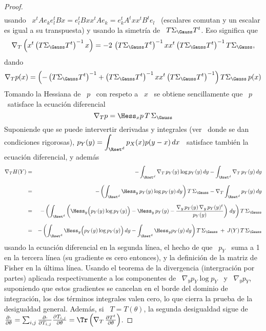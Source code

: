 \begin{proof}
\begin{eqnarray*}
  \end{eqnarray*}
  usando \ $x^t A e_k e_l^t B x = e_l^t B x x^t A e_k = e_k^t A^t x x^t B^t e_l$
  \  (escalares comutan y  un escalar  es igual  a su  transpuesta) y  usando la
  simetr\'ia de \ $T \Sigma_\Gauss T^t$.  Eso significa que
  \[
  \nabla_T \left( x^t \left( T \Sigma_\Gauss T^t \right)^{-1} x \right) = - 2 \,
  \left(  T \Sigma_\Gauss  T^t \right)^{-1}  x  x^t \left(  T \Sigma_\Gauss  T^t
  \right)^{-1} T \Sigma_\Gauss,
  \]
  dando
  \[
  \nabla_T p(x)  = \left( - \left(  T \Sigma_\Gauss T^t \right)^{-1}  + \left( T
      \Sigma_\Gauss  T^t   \right)^{-1}  x   x^t  \left(  T   \Sigma_\Gauss  T^t
    \right)^{-1} \right) T \Sigma_\Gauss \, p(x)
  \]
  Tomando la Hessiana de \ $p$ \  con respeto a \ $x$ \ se obtiene sencillamente
  que \ $p$ \ satisface la ecuaci\'on diferencial
  \[
  \nabla_T p = \Hess_x p \, T \, \Sigma_\Gauss
  \]
  Suponiende que  se puede intervertir derivadas  y integrales (ver~\cite{Bar84,
    Bar86}  donde  se  dan   condiciones  rigorosas),  $\displaystyle  p_Y(y)  =
  \int_{\Rset^d}  p_X(x)  p(y-x) \,  dx$  \  satisface  tambi\'en la  ecuaci\'on
  diferencial, y adem\'as
  \begin{eqnarray*}
  \nabla_T H(Y) & = & - \int_{\Rset^d} \nabla_T \, p_Y(y) \log p_Y(y)
  \, dy - \int_{\Rset^d} \nabla_T \, p_Y(y) \, dy\\[2.5mm]
  & = & - \left( \int_{\Rset^d} \Hess_y \, p_Y(y) \log p_Y(y) \, dy \right) T \,
  \Sigma_\Gauss - \nabla_T \int_{\Rset^d} p_Y(y) \, dy\\[2.5mm]
  & = & - \left( \int_{\Rset^d} \left( \Hess_y \Big( p_Y(y) \log p_Y(y) \Big) -
  \Hess_y \, p_Y(y) - \frac{\nabla_y \, p_Y(y) \, \nabla_y \, p_Y(y)^t}{p_Y(y)}
  \right) \, dy \right) T \, \Sigma_\Gauss\\[2.5mm]
  & = & - \left( \int_{\Rset^d} \Hess_y \Big( p_Y(y) \log p_Y(y) \Big) \, dy -
  \int_{\Rset^d} \Hess_y p_Y(y) \, dy \right) T \, \Sigma_\Gauss \: + \: J(Y) \, T
  \, \Sigma_\Gauss
  \end{eqnarray*}
  usando la ecuaci\'on diferencial en la  segunda l\'inea, el hecho de que \ $p_Y$
  \  suma a  1  en  la tercera  l\'inea  (su gradiente  es  cero  entonces), y  la
  definici\'on de la matriz de Fisher en la \'ultima l\'inea. Usando el teorema de
  la  divergencia (intergraci\'on  por  partes) aplicada  respectivamente a  los
  componentes de \ $\nabla_y p_Y \log  p_Y$ \ y \ $\nabla_y p_Y$, suponiendo que
  estos gradientes se cancelan en el borde del dominio de integraci\'on, los dos
  t\'erminos integrales  valen cero, lo que  cierra la prueba  de la desigualdad
  general.  Adem\'as,  si \ $T =  T(\theta)$, la segunda desigualdad  sigue de \
  $\frac{\partial   \cdot}{\partial    \theta}   =   \sum_{i,j}   \frac{\partial
    \cdot}{\partial   T_{i,j}}   \frac{\partial   T_{i,j}}{\partial  \theta}   =
  \Tr\left( \nabla_T \, \frac{\partial T^t}{\partial \theta} \right)$.
\end{proof}

